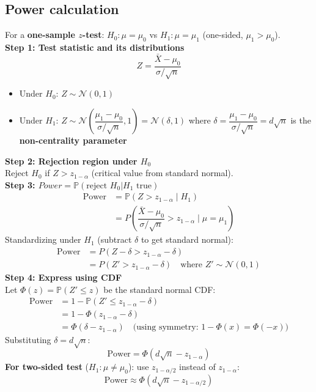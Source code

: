 \subsection{Power calculation}
For a \textbf{one-sample $z$-test}: $H_0: \mu = \mu_0$ vs $H_1: \mu = \mu_1$ (one-sided, $\mu_1 > \mu_0$).\\[0.5em]
\textbf{Step 1: Test statistic and its distributions}
$$Z = \dfrac{\bar{X} - \mu_0}{\sigma/\sqrt{n}}$$
\begin{itemize}
    \item Under $H_0$: $Z \sim \mathcal{N}(0, 1)$
    \item Under $H_1$: $Z \sim \mathcal{N}\left(\dfrac{\mu_1 - \mu_0}{\sigma/\sqrt{n}}, 1\right) = \mathcal{N}(\delta, 1)$
        where $\delta = \dfrac{\mu_1 - \mu_0}{\sigma/\sqrt{n}} = d\sqrt{n}$ is the \textbf{non-centrality parameter}
\end{itemize}
\textbf{Step 2: Rejection region under $H_0$}\\
Reject $H_0$ if $Z > z_{1-\alpha}$ (critical value from standard normal).\\[0.5em]
\textbf{Step 3: $Power = \mathbb{P}(\text{reject }H_0 | H_1\text{ true})$}
\begin{align*}
\text{Power} &= \mathbb{P}(Z > z_{1-\alpha} \mid H_1) \\
&= P\left(\dfrac{\bar{X} - \mu_0}{\sigma/\sqrt{n}} > z_{1-\alpha} \mid \mu = \mu_1\right)
\end{align*}
Standardizing under $H_1$ (subtract $\delta$ to get standard normal):
\begin{align*}
\text{Power} &= P\left(Z - \delta > z_{1-\alpha} - \delta\right) \\
&= P\left(Z' > z_{1-\alpha} - \delta\right) \quad \text{where } Z' \sim \mathcal{N}(0,1)
\end{align*}
\textbf{Step 4: Express using CDF}\\
Let $\Phi(z) = \mathbb{P}(Z' \leq z)$ be the standard normal CDF:
\begin{align*}
\text{Power} &= 1 - \mathbb{P}(Z' \leq z_{1-\alpha} - \delta) \\
&= 1 - \Phi(z_{1-\alpha} - \delta) \\
&= \Phi(\delta - z_{1-\alpha}) \quad \text{(using symmetry: } 1-\Phi(x) = \Phi(-x)\text{)}
\end{align*}
Substituting $\delta = d\sqrt{n}$:
$$\boxed{\text{Power} = \Phi\left(d\sqrt{n} - z_{1-\alpha}\right)}$$
\textbf{For two-sided test} ($H_1: \mu \neq \mu_0$): use $z_{1-\alpha/2}$ instead of $z_{1-\alpha}$:
$$\text{Power} \approx \Phi\left(d\sqrt{n} - z_{1-\alpha/2}\right)$$

